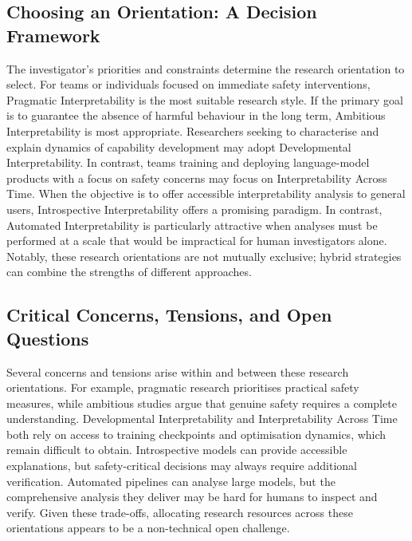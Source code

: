 \subsection{Choosing an Orientation: A Decision Framework}
\label{subsec:choosing orientation}
The investigator's priorities and constraints determine the research orientation to select. For teams or individuals focused on immediate safety interventions, Pragmatic Interpretability is the most suitable research style. If the primary goal is to guarantee the absence of harmful behaviour in the long term, Ambitious Interpretability is most appropriate. Researchers seeking to characterise and explain dynamics of capability development may adopt Developmental Interpretability. In contrast, teams training and deploying language-model products with a focus on safety concerns may focus on Interpretability Across Time. When the objective is to offer accessible interpretability analysis to general users, Introspective Interpretability offers a promising paradigm. In contrast, Automated Interpretability is particularly attractive when analyses must be performed at a scale that would be impractical for human investigators alone. Notably, these research orientations are not mutually exclusive; hybrid strategies can combine the strengths of different approaches.

\subsection{Critical Concerns, Tensions, and Open Questions}

Several concerns and tensions arise within and between these research orientations. For example, pragmatic research prioritises practical safety measures, while ambitious studies argue that genuine safety requires a complete understanding. Developmental Interpretability and Interpretability Across Time both rely on access to training checkpoints and optimisation dynamics, which remain difficult to obtain. Introspective models can provide accessible explanations, but safety-critical decisions may always require additional verification. Automated pipelines can analyse large models, but the comprehensive analysis they deliver may be hard for humans to inspect and verify. Given these trade-offs, allocating research resources across these orientations appears to be a non-technical open challenge.

